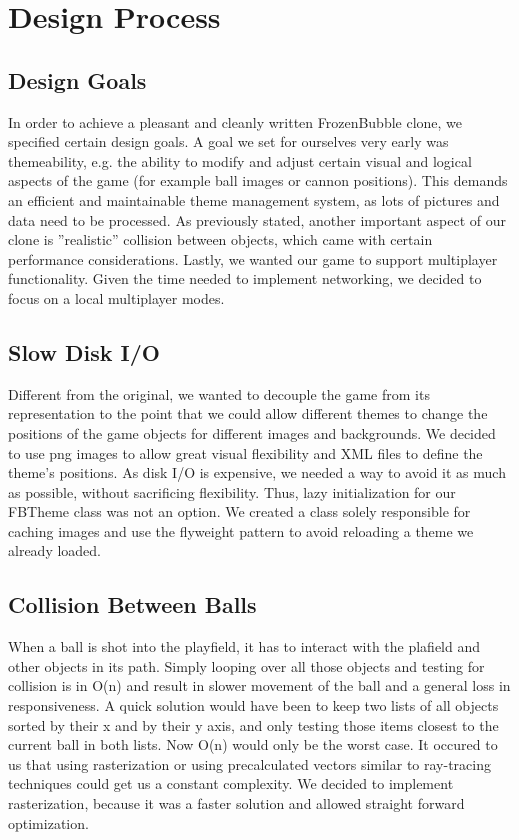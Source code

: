 \section{Design Process}
\subsection{Design Goals}
In order to achieve a pleasant and cleanly written FrozenBubble clone, we specified certain design goals.
A goal we set for ourselves very early was themeability, e.g. the ability to modify and 
adjust certain visual and logical aspects of the game (for example ball images or 
cannon positions). This demands an efficient and maintainable theme management 
system, as lots of pictures and data need to be processed.
As previously stated, another important aspect of our clone is ''realistic'' 
collision between objects, which came with certain performance considerations.
Lastly, we wanted our game to support multiplayer functionality. Given the time 
needed to implement networking, we decided to focus on a local multiplayer modes. 

\subsection{Slow Disk I/O}
%
Different from the original, we wanted to decouple the game from its representation 
to the point that we could allow different themes to change the positions of the 
game objects for different images and backgrounds. We decided to use png images to allow 
great visual flexibility and XML files to define the theme's positions. As disk I/O
is expensive, we needed a way to avoid it as much as possible, without sacrificing 
flexibility. Thus, lazy initialization for our FBTheme class was not an option. 
We created a class solely responsible for caching images and use the flyweight 
pattern to avoid reloading a theme we already loaded.
%
\subsection{Collision Between Balls}
\label{sec:collision}
When a ball is shot into the playfield, it has to interact with the plafield 
and other objects in its path. Simply looping over all those objects and 
testing for collision is in O(n) and result in slower 
movement of the ball and a general loss in responsiveness. A quick solution 
would have been to keep two lists of all objects sorted by their x and by their 
y axis, and only testing those items closest to the current ball in both lists.
Now O(n) would only be the worst case. 
It occured to us that using rasterization or using precalculated vectors similar 
to ray-tracing techniques could get us a constant complexity. We decided 
to implement rasterization, because it was a faster solution and allowed straight 
forward optimization.
%
